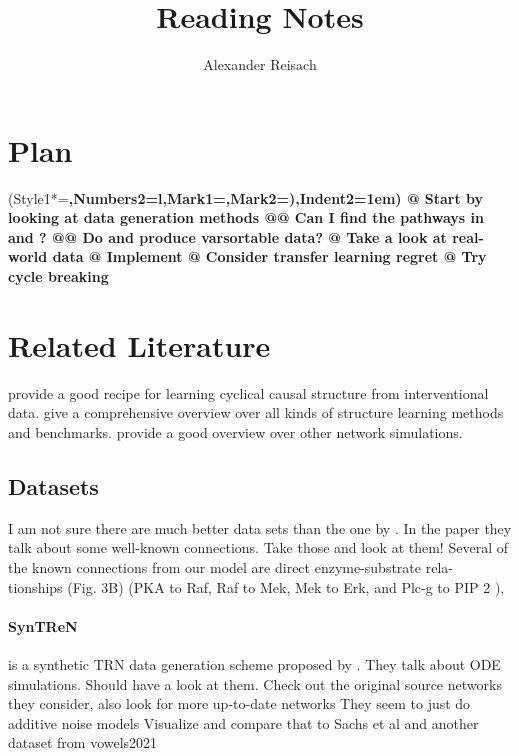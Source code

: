 \documentclass{article}
\title{Reading Notes}
\author{Alexander Reisach}
\begin{document}
    
\maketitle

\section{Plan}
\begin{easylist}
    \ListProperties(Style1*=\bfseries,Numbers2=l,Mark1={},Mark2={)},Indent2=1em)
    @ Start by looking at data generation methods
    @@ Can I find the \cite{sachs2005causal} pathways in \cite{belinky2015pathcards} and \cite{perfetto2016signor}?
    @@ Do \cite{van2006syntren} and \cite{schaffter2011genenetweaver} produce varsortable data?
    @ Take a look at real-world data
    @ Implement \cite{brouillard2020differentiable}
    @ Consider transfer learning regret
    @ Try cycle breaking
\end{easylist}

\section{Related Literature}
\cite{itani2010structure} provide a good recipe for learning cyclical causal structure from interventional data.
\cite{vowels2021} give a comprehensive overview over all kinds of structure learning methods and benchmarks.
\cite{van2006syntren} provide a good overview over other network simulations.

\subsection{Datasets}

I am not sure there are much better data sets than the one by \cite{sachs2005causal}.
In the paper they talk about some well-known connections. Take those and look at them!
Several of the known connections from
our model are direct enzyme-substrate rela-
tionships (Fig. 3B) (PKA to Raf, Raf to Mek,
Mek to Erk, and Plc-g to PIP 2 ),

\paragraph{SynTReN}
is a synthetic TRN data generation scheme proposed by \cite{van2006syntren}. 
They talk about ODE simulations. Should have a look at them.
Check out the original source networks they consider, also look for more up-to-date networks
They seem to just do additive noise models
Visualize and compare that to Sachs et al and another dataset from vowels2021
\end{document}
